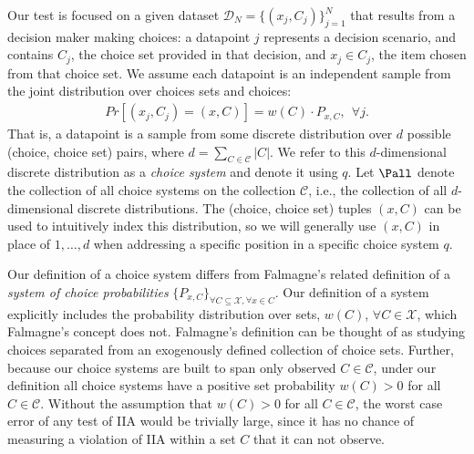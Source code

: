 \documentclass[10pt]{article}
\begin{document}
\begin{ReviewVerbatim}
	Our test is focused on a given dataset $\mathcal{D}_N = \lbrace (x_j, C_j) \rbrace_{j=1}^N$ that results from a decision maker making choices: a datapoint $j$ represents a decision scenario, and contains $C_j$, the choice set provided in that decision, and $x_j \in C_j$, the item chosen from that choice set. We assume each datapoint is an independent sample from the joint distribution over choices sets and choices:
	\begin{align*}
	Pr[(x_j, C_j) = (x, C)] = w(C) \cdot P_{x,C}, \ \ \forall j.
	\end{align*}
	That is, a datapoint is a sample from some discrete distribution over $d$ possible (choice, choice set) pairs, where $d = \sum_{C \in \mathcal{C}} |C|$. We refer to this $d$-dimensional discrete distribution as a \textit{choice system} and denote it using $q$.
	Let $\Pall$ denote the collection of all choice systems on the collection $\mathcal{C}$, i.e., the collection of all $d$-dimensional discrete distributions. The (choice, choice set) tuples $(x,C)$ can be used to intuitively index this distribution, so we will generally use $(x,C)$ in place of $1,\ldots,d$ when addressing a specific position in a specific choice system $q$.


	Our definition of a choice system differs from Falmagne's \cite{falmagne1978representation,barbera1986falmagne} related definition of a {\it system of choice probabilities} $\{P_{x,C}\}_{\forall C \subseteq \mathcal X, \forall x \in C}$. Our definition of a system explicitly includes the probability distribution over sets, $w(C)$, $\forall C \in \mathcal X$, which Falmagne's concept does not. Falmagne's definition can be thought of as studying choices separated from an exogenously defined collection of choice sets. Further, because our choice systems are built to span only observed $C \in \mathcal{C}$, under our definition all choice systems have a positive set probability $w(C)>0$ for all $C \in \mathcal{C}$. Without the assumption that $w(C)>0$ for all $C \in \mathcal{C}$, the worst case error of any test of IIA would be trivially large, since it has no chance of measuring a violation of IIA within a set $C$ that it can not observe.


\end{ReviewVerbatim}
\end{document}
